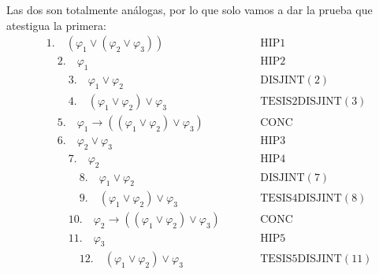 \documentclass{article}
\begin{document}
Las dos son totalmente análogas, por lo que solo vamos a dar la prueba que atestigua la primera:
\begin{equation*}
  \begin{alignedat}{2}
     & 1. \quad (\varphi_1\lor(\varphi_2\lor\varphi_3))                                                  &  & \qquad\text{HIP}1                              \\
     & \quad 2. \quad \varphi_1                                                                          &  & \qquad\text{HIP}2                              \\
     & \qquad 3. \quad \varphi_1\lor\varphi_2                                                            &  & \qquad\text{DISJINT}(2)                        \\
     & \qquad 4. \quad (\varphi_1\lor\varphi_2)\lor\varphi_3                                             &  & \qquad\text{TESIS}2\text{DISJINT}(3)           \\
     & \quad 5. \quad \varphi_1\to((\varphi_1\lor\varphi_2)\lor\varphi_3)                                &  & \qquad\text{CONC}                              \\
     & \quad 6. \quad \varphi_2\lor\varphi_3                                                             &  & \qquad\text{HIP}3                              \\
     & \qquad 7. \quad \varphi_2                                                                         &  & \qquad\text{HIP}4                              \\
     & \qquad\quad 8. \quad \varphi_1\lor\varphi_2                                                       &  & \qquad\text{DISJINT}(7)                        \\
     & \qquad\quad 9. \quad (\varphi_1\lor\varphi_2)\lor\varphi_3                                        &  & \qquad\text{TESIS}4\text{DISJINT}(8)           \\
     & \qquad 10. \quad \varphi_2\to((\varphi_1\lor\varphi_2)\lor\varphi_3)                              &  & \qquad\text{CONC}                              \\
     & \qquad 11. \quad \varphi_3                                                                        &  & \qquad\text{HIP}5                              \\
     & \qquad\quad 12. \quad (\varphi_1\lor\varphi_2)\lor\varphi_3                                       &  & \qquad\text{TESIS}5\text{DISJINT}(11)          \\

\end{alignedat}
\end{equation*}
\end{document}
